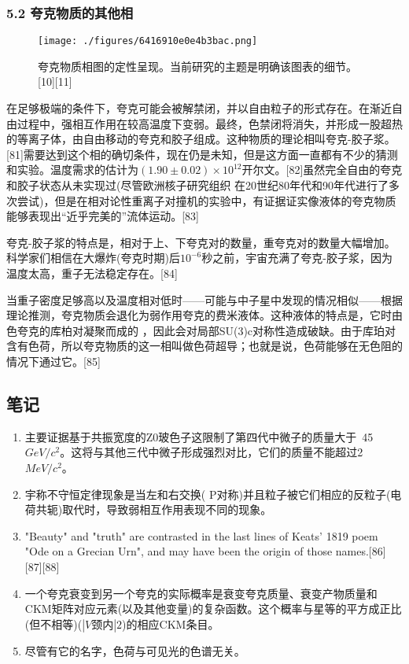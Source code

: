 \subsubsection{5.2 夸克物质的其他相}
\begin{figure}[ht]
\centering
\texttt{[image: ./figures/6416910e0e4b3bac.png]}
\caption{夸克物质相图的定性呈现。当前研究的主题是明确该图表的细节。[10][11]} \label{fig_Quark_12}
\end{figure}
在足够极端的条件下，夸克可能会被解禁闭，并以自由粒子的形式存在。在渐近自由过程中，强相互作用在较高温度下变弱。最终，色禁闭将消失，并形成一股超热的等离子体，由自由移动的夸克和胶子组成。这种物质的理论相叫夸克-胶子浆。[81]需要达到这个相的确切条件，现在仍是未知，但是这方面一直都有不少的猜测和实验。温度需求的估计为$(1.90 \pm 0.02) \times 10^{12}$开尔文。[82]虽然完全自由的夸克和胶子状态从未实现过(尽管欧洲核子研究组织 在20世纪80年代和90年代进行了多次尝试)，但是在相对论性重离子对撞机的实验中，有证据证实像液体的夸克物质能够表现出“近乎完美的”流体运动。[83]

夸克-胶子浆的特点是，相对于上、下夸克对的数量，重夸克对的数量大幅增加。科学家们相信在大爆炸(夸克时期)后$10^{-6}$秒之前，宇宙充满了夸克-胶子浆，因为温度太高，重子无法稳定存在。[84]

当重子密度足够高以及温度相对低时——可能与中子星中发现的情况相似——根据理论推测，夸克物质会退化为弱作用夸克的费米液体。这种液体的特点是，它时由色夸克的库柏对凝聚而成的 ，因此会对局部SU(3)c对称性造成破缺。由于库珀对含有色荷，所以夸克物质的这一相叫做色荷超导；也就是说，色荷能够在无色阻的情况下通过它。[85]

\subsection{笔记}
\begin{enumerate}
\item 主要证据基于共振宽度的Z0玻色子这限制了第四代中微子的质量大于~45 $GeV/c^2$。这将与其他三代中微子形成强烈对比，它们的质量不能超过2 $MeV/c^2$。
\item 宇称不守恒定律现象是当左和右交换( P对称)并且粒子被它们相应的反粒子(电荷共轭)取代时，导致弱相互作用表现不同的现象。
\item "Beauty" and "truth" are contrasted in the last lines of Keats' 1819 poem "Ode on a Grecian Urn", and may have been the origin of those names.[86][87][88]
\item 一个夸克衰变到另一个夸克的实际概率是衰变夸克质量、衰变产物质量和CKM矩阵对应元素(以及其他变量)的复杂函数。这个概率与星等的平方成正比(但不相等)($|V\text{颈内}|2$)的相应CKM条目。
\item 尽管有它的名字，色荷与可见光的色谱无关。
\end{enumerate}

